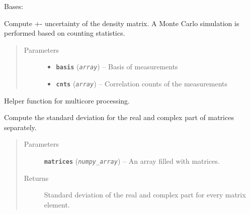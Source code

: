\documentclass[letterpaper,10pt,english]{sphinxmanual}
\begin{document}
\begin{fulllineitems}
\label{modules:Tomography.Errorize}
Bases: {\hyperref[modules:Tomography.DensityMatrix]{}}

Compute +- uncertainty of the density matrix.
A Monte Carlo simulation is performed based on counting statistics.
\begin{quote}\begin{description}
\item[{Parameters}] \leavevmode\begin{itemize}
\item {} 
\textbf{\texttt{basis}} (\emph{\texttt{array}}) -- Basis of measurements

\item {} 
\textbf{\texttt{cnts}} (\emph{\texttt{array}}) -- Correlation counts of the measurements

\end{itemize}

\end{description}\end{quote}

\begin{fulllineitems}
\label{modules:Tomography.Errorize.collect_results}
Helper function for multicore processing.

\end{fulllineitems}


\begin{fulllineitems}
\label{modules:Tomography.Errorize.complex_std_dev}
Compute the standard deviation for the real and complex part of matrices separately.
\begin{quote}\begin{description}
\item[{Parameters}] \leavevmode
\textbf{\texttt{matrices}} (\emph{\texttt{numpy\_array}}) -- An array filled with matrices.

\item[{Returns}] \leavevmode
Standard deviation of the real and complex part for every matrix element.


\end{description}
\end{quote}
\end{fulllineitems}
\end{fulllineitems}
\end{document}
